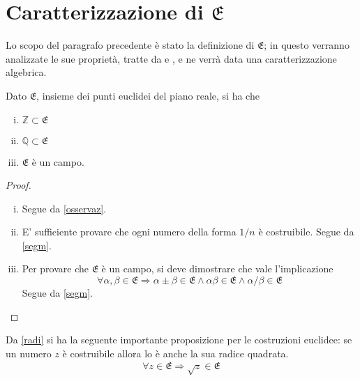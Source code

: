 \section{Caratterizzazione di $\mathfrak{E}$} 
Lo scopo del paragrafo precedente è stato la definizione di $\mathfrak{E}$; in questo verranno analizzate le sue proprietà, tratte da \cite{cattaneo} e \cite{Procesi}, e ne verrà data una caratterizzazione algebrica.

\begin{prop} \label{propcaratt}
Dato $\mathfrak{E}$, insieme dei punti euclidei del piano reale, si ha che
\begin{enumerate} [i)]
\item $\mathbb{Z} \subset \mathfrak{E}$ 
\item $\mathbb{Q} \subset \mathfrak{E}$
\item $\mathfrak{E}$ è un campo.
\end{enumerate}
\end{prop}

\begin{proof}
\begin {enumerate} [i)]
\item Segue da \ref{osservaz}.
\item E' sufficiente provare che ogni numero della forma $1/n$ è costruibile. Segue da \ref{segm}.
\item Per provare che $\mathfrak{E}$ è un campo, si deve dimostrare che vale l'implicazione
\begin{equation}
\forall \alpha, \beta \in\mathfrak{E} \Rightarrow \alpha \pm \beta \in \mathfrak{E}  \wedge  \alpha\beta\in \mathfrak{E}  \wedge \alpha / \beta \in \mathfrak{E}
\end{equation}
Segue da \ref{segm}. 
\end{enumerate}
\end{proof}

\begin{osservazione} \label{osscaratt}
Da \ref{radi} si ha la seguente importante proposizione per le costruzioni euclidee: se un numero $z$ è costruibile allora lo è anche la sua radice quadrata.
\begin{align*}
\forall z \in \mathfrak{E} \Rightarrow \sqrt{z} \in \mathfrak{E}
\end{align*}
\end{osservazione}

